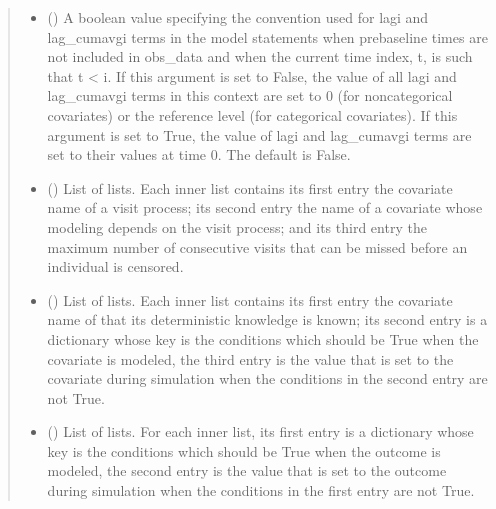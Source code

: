 \documentclass[letterpaper,10pt,english]{sphinxmanual}
\begin{document}
\begin{fulllineitems}
\begin{quote}
\begin{description}
\begin{itemize}
\item {} 
\sphinxAtStartPar
{} (\sphinxstyleliteralemphasis{\sphinxupquote{, }}) \textendash{} A boolean value specifying the convention used for lagi and lag\_cumavgi terms in the model statements when
pre\sphinxhyphen{}baseline times are not included in obs\_data and when the current time index, t, is such that t \textless{} i. If this
argument is set to False, the value of all lagi and lag\_cumavgi terms in this context are set to 0 (for
non\sphinxhyphen{}categorical covariates) or the reference level (for categorical covariates). If this argument is set to
True, the value of lagi and lag\_cumavgi terms are set to their values at time 0. The default is False.

\item {} 
\sphinxAtStartPar
{} (\sphinxstyleliteralemphasis{\sphinxupquote{, }}) \textendash{} List of lists. Each inner list contains its first entry the covariate name of a visit process; its second entry
the name of a covariate whose modeling depends on the visit process; and its third entry the maximum number
of consecutive visits that can be missed before an individual is censored.

\item {} 
\sphinxAtStartPar
{} (\sphinxstyleliteralemphasis{\sphinxupquote{, }}) \textendash{} List of lists. Each inner list contains its first entry the covariate name of that its deterministic knowledge
is known; its second entry is a dictionary whose key is the conditions which should be True when the covariate
is modeled, the third entry is the value that is set to the covariate during simulation when the conditions
in the second entry are not True.

\item {} 
\sphinxAtStartPar
{} (\sphinxstyleliteralemphasis{\sphinxupquote{, }}) \textendash{} List of lists. For each inner list, its first entry is a dictionary whose key is the conditions which
should be True when the outcome is modeled, the second entry is the value that is set to the outcome during
simulation when the conditions in the first entry are not True.


\end{itemize}
\end{description}
\end{quote}
\end{fulllineitems}
\end{document}
